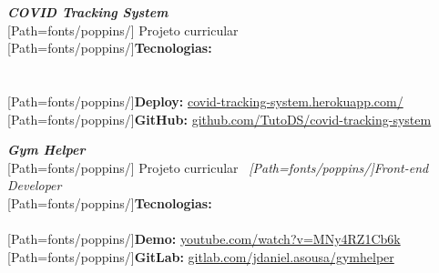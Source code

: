 \begin{minipage}{.5\textwidth}
\textbf{\textit{COVID Tracking System}}\\[3pt]
{
	\scriptsize
	[Path=fonts/poppins/]
	Projeto curricular\\[2pt]

	{[Path=fonts/poppins/]\textbf{Tecnologias:}}\\
	    \\[1pt]  \\[2pt]

	{[Path=fonts/poppins/]\textbf{Deploy:}} \href{https://covid-tracking-system.herokuapp.com/}{covid-tracking-system.herokuapp.com/}\\
	{[Path=fonts/poppins/]\textbf{GitHub:}} \href{https://github.com/TutoDS/covid-tracking-system}{github.com/TutoDS/covid-tracking-system}
}
\end{minipage}
\begin{minipage}{.5\textwidth}
	\textbf{\textit{Gym Helper}}\\[3pt]
	{
		\scriptsize
		[Path=fonts/poppins/]
		Projeto curricular \textemdash~\textit{[Path=fonts/poppins/]Front-end Developer}\\[2pt]

		{[Path=fonts/poppins/]\textbf{Tecnologias:}}\\
		    \\[2pt]

		{[Path=fonts/poppins/]\textbf{Demo:}} \href{https://www.youtube.com/watch?v=MNy4RZ1Cb6k}{youtube.com/watch?v=MNy4RZ1Cb6k}\\
		{[Path=fonts/poppins/]\textbf{GitLab:}} \href{https://gitlab.com/jdaniel.asousa/gymhelper}{gitlab.com/jdaniel.asousa/gymhelper}
	}
\end{minipage}

\vspace{10pt}

